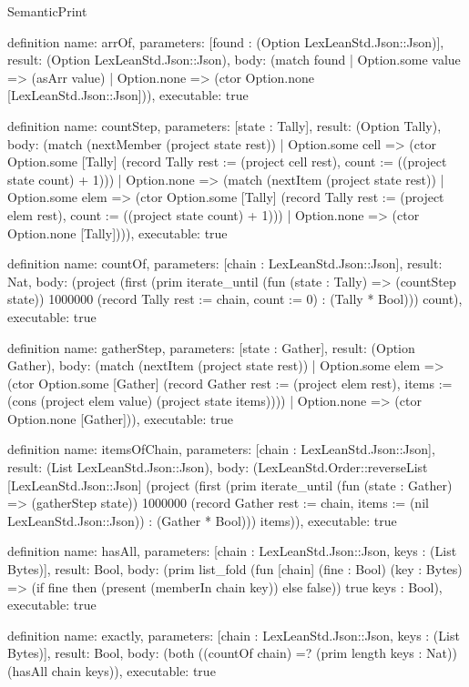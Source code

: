 \begin{lexlean}{SemanticPrint}
\begin{semanticmodule}
definition{
  name: arrOf,
  parameters: [found : (Option LexLeanStd.Json::Json)],
  result: (Option LexLeanStd.Json::Json),
  body: (match found
    | Option.some value => (asArr value)
    | Option.none => (ctor Option.none [LexLeanStd.Json::Json])),
  executable: true
}

definition{
  name: countStep,
  parameters: [state : Tally],
  result: (Option Tally),
  body: (match (nextMember (project state rest))
    | Option.some cell => (ctor Option.some [Tally] (record Tally {rest := (project cell rest), count := ((project state count) + 1)}))
    | Option.none => (match (nextItem (project state rest))
      | Option.some elem => (ctor Option.some [Tally] (record Tally {rest := (project elem rest), count := ((project state count) + 1)}))
      | Option.none => (ctor Option.none [Tally]))),
  executable: true
}

definition{
  name: countOf,
  parameters: [chain : LexLeanStd.Json::Json],
  result: Nat,
  body: (project (first (prim iterate_until (fun (state : Tally) => (countStep state)) 1000000 (record Tally {rest := chain, count := 0}) : (Tally * Bool))) count),
  executable: true
}

definition{
  name: gatherStep,
  parameters: [state : Gather],
  result: (Option Gather),
  body: (match (nextItem (project state rest))
    | Option.some elem => (ctor Option.some [Gather] (record Gather {rest := (project elem rest), items := (cons (project elem value) (project state items))}))
    | Option.none => (ctor Option.none [Gather])),
  executable: true
}

definition{
  name: itemsOfChain,
  parameters: [chain : LexLeanStd.Json::Json],
  result: (List LexLeanStd.Json::Json),
  body: (LexLeanStd.Order::reverseList [LexLeanStd.Json::Json] (project (first (prim iterate_until (fun (state : Gather) => (gatherStep state)) 1000000 (record Gather {rest := chain, items := (nil LexLeanStd.Json::Json)}) : (Gather * Bool))) items)),
  executable: true
}

definition{
  name: hasAll,
  parameters: [chain : LexLeanStd.Json::Json, keys : (List Bytes)],
  result: Bool,
  body: (prim list_fold (fun [chain] (fine : Bool) (key : Bytes) => (if fine then (present (memberIn chain key)) else false)) true keys : Bool),
  executable: true
}

definition{
  name: exactly,
  parameters: [chain : LexLeanStd.Json::Json, keys : (List Bytes)],
  result: Bool,
  body: (both ((countOf chain) =? (prim length keys : Nat)) (hasAll chain keys)),
  executable: true
}


\end{semanticmodule}
\end{lexlean}

